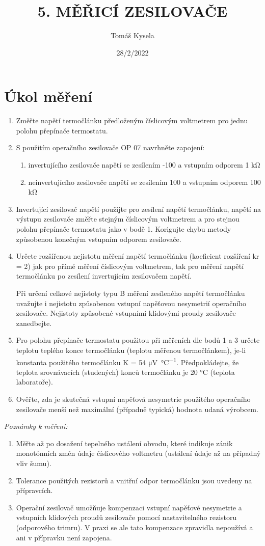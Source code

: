 \documentclass{article}
\title{\textbf{5. MĚŘICÍ ZESILOVAČE}}
\author{Tomáš Kysela}
\date{28/2/2022}
\begin{document}
\maketitle

\section{Úkol měření}
\begin{enumerate}
	\item Změřte napětí termočlánku předloženým číslicovým voltmetrem pro jednu polohu přepínače termostatu.
	\item S použitím operačního zesilovače OP 07 navrhněte zapojení:
	\begin{enumerate}
		\item invertujícího zesilovače napětí se zesílením -100 a vstupním odporem 1 \si{\kilo\ohm}
		\item neinvertujícího zesilovače napětí se zesílením 100 a vstupním odporem 100 \si{\kilo\ohm}	\end{enumerate}
	\item Invertující zesilovač napětí použijte pro zesílení napětí termočlánku, napětí na výstupu zesilovače změřte stejným číslicovým voltmetrem a pro stejnou  polohu  přepínače termostatu jako v bodě 1. Korigujte chybu metody způsobenou konečným vstupním odporem zesilovače.
	\item Určete rozšířenou nejistotu měření napětí termočlánku (koeficient rozšíření kr = 2) jak pro přímé měření číslicovým voltmetrem, tak pro měření napětí termočlánku  po	zesílení invertujícím zesilovačem napětí.

	Při určení celkové nejistoty typu  B  měření  zesíleného  napětí termočlánku uvažujte i nejistotu způsobenou vstupní napěťovou nesymetrií operačního zesilovače. Nejistoty způsobené vstupními klidovými proudy zesilovače zanedbejte.
	\item Pro polohu přepínače  termostatu použitou při měřeních dle bodů 1 a 3 určete teplotu teplého konce termočlánku (teplotu měřenou termočlánkem), je-li konstanta použitého termočlánku K = 54 \si{\micro\volt\per\degreeCelsius}. Předpokládejte, že teplota srovnávacích (studených) konců termočlánku je 20 °C (teplota laboratoře).
	\item Ověřte, zda je skutečná vstupní napěťová nesymetrie použitého operačního zesilovače menší než maximální (případně typická) hodnota udaná výrobcem.
\end{enumerate}
\textit{Poznámky k měření:}
\begin{enumerate}
	\item Měřte  až  po  dosažení  tepelného  ustálení  obvodu,  které  indikuje  zánik  monotónních  změn údaje číslicového voltmetru (ustálení údaje až na případný vliv šumu).
	\item Tolerance použitých rezistorů a vnitřní odpor termočlánku jsou uvedeny na přípravcích.
	\item Operační zesilovač umožňuje kompenzaci vstupní napěťové nesymetrie a vstupních klidových proudů zesilovače pomocí nastavitelného rezistoru (odporového trimru). V praxi se ale tato kompenzace zpravidla nepoužívá a ani v přípravku není zapojena.
\end{enumerate}
\end{document}
